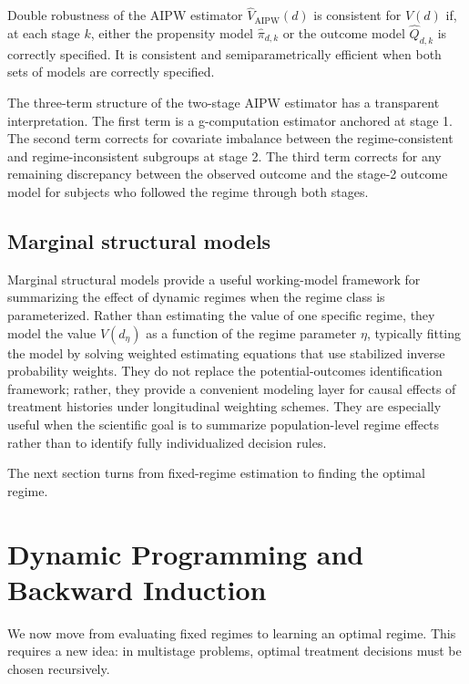 \documentclass[master.tex]{subfiles}
\begin{document}
\begin{thm}{Double robustness of the AIPW estimator}
\label{w15:thm:dr}
$\widehat{V}_{\mathrm{AIPW}}(d)$ is consistent for $V(d)$ if, at each stage $k$, either the propensity model $\hat\pi_{d,k}$ or the outcome model $\widehat{Q}_{d,k}$ is correctly specified. It is consistent and semiparametrically efficient when both sets of models are correctly specified.
\end{thm}

\begin{remark}
The three-term structure of the two-stage AIPW estimator has a transparent interpretation. The first term is a g-computation estimator anchored at stage 1. The second term corrects for covariate imbalance between the regime-consistent and regime-inconsistent subgroups at stage 2. The third term corrects for any remaining discrepancy between the observed outcome and the stage-2 outcome model for subjects who followed the regime through both stages.
\end{remark}

\subsection{Marginal structural models}

Marginal structural models provide a useful working-model framework for summarizing the effect of dynamic regimes when the regime class is parameterized. Rather than estimating the value of one specific regime, they model the value $V(d_\eta)$ as a function of the regime parameter $\eta$, typically fitting the model by solving weighted estimating equations that use stabilized inverse probability weights. They do not replace the potential-outcomes identification framework; rather, they provide a convenient modeling layer for causal effects of treatment histories under longitudinal weighting schemes. They are especially useful when the scientific goal is to summarize population-level regime effects rather than to identify fully individualized decision rules.

\medskip
The next section turns from fixed-regime estimation to finding the optimal regime.

\section{Dynamic Programming and Backward Induction}
\label{w15:sec:dp}

We now move from evaluating fixed regimes to learning an optimal regime. This requires a new idea: in multistage problems, optimal treatment decisions must be chosen recursively.
\end{document}
